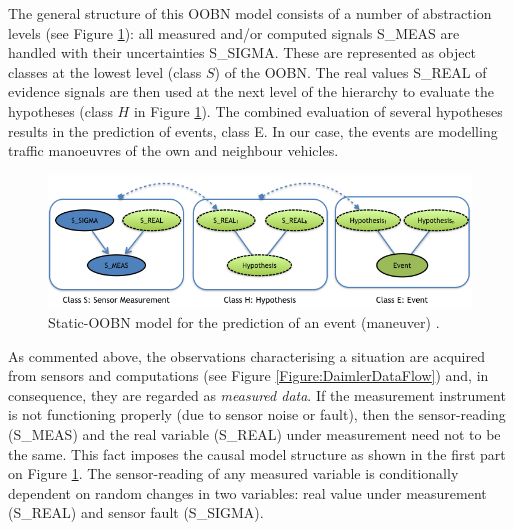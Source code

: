 

The general structure of this OOBN model consists of a number of abstraction levels (see Figure \ref{Figure:DaimlerOOBNAbstraction}): all measured and/or computed signals S\_MEAS are handled with their uncertainties S\_SIGMA. These are represented as object classes at the lowest level (class $S$) of the OOBN. The real values S\_REAL of evidence signals are then used at the next level of the hierarchy to evaluate the hypotheses (class $H$ in Figure \ref{Figure:DaimlerOOBNAbstraction}). The combined evaluation of several hypotheses results in the prediction of events, class E. In our case, the events are modelling traffic manoeuvres of the own and neighbour vehicles.

\begin{figure}
\begin{center}
\includegraphics[scale=0.58]{./figures/DaimlerOOBNAbstraction}
\caption{\label{Figure:DaimlerOOBNAbstraction} Static-OOBN model for the prediction of an event (maneuver) \cite{Weidl2014}.}
\end{center}
\end{figure}

As commented above, the observations characterising a situation are acquired from sensors and computations (see Figure \ref{Figure:DaimlerDataFlow}) and, in consequence, they are regarded as  \textit{measured data}. If the measurement instrument is not functioning properly (due to sensor noise or fault), then the sensor-reading (S\_MEAS) and the real variable (S\_REAL) under measurement need not to be the same. This fact imposes the causal model structure as shown in the first part on Figure \ref{Figure:DaimlerOOBNAbstraction}. The sensor-reading of any measured variable is conditionally dependent on random changes in two variables: real value under measurement (S\_REAL) and sensor fault (S\_SIGMA).

